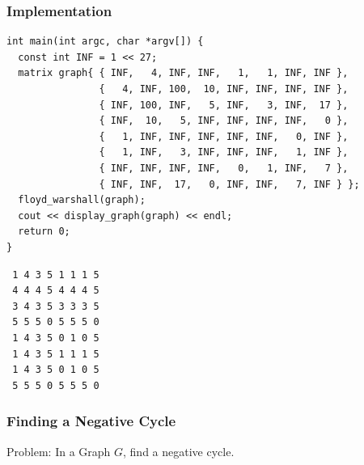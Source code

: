 \documentclass{beamer}
\begin{document}
\begin{frame}[containsverbatim]
\frametitle{Implementation}

\tiny
\begin{lstlisting}
int main(int argc, char *argv[]) {
  const int INF = 1 << 27;
  matrix graph{ { INF,   4, INF, INF,   1,   1, INF, INF },
                {   4, INF, 100,  10, INF, INF, INF, INF },
                { INF, 100, INF,   5, INF,   3, INF,  17 },
                { INF,  10,   5, INF, INF, INF, INF,   0 },
                {   1, INF, INF, INF, INF, INF,   0, INF },
                {   1, INF,   3, INF, INF, INF,   1, INF },
                { INF, INF, INF, INF,   0,   1, INF,   7 },
                { INF, INF,  17,   0, INF, INF,   7, INF } };
  floyd_warshall(graph);
  cout << display_graph(graph) << endl;
  return 0;
}
\end{lstlisting}

\scriptsize

\begin{verbatim}
 1 4 3 5 1 1 1 5
 4 4 4 5 4 4 4 5
 3 4 3 5 3 3 3 5
 5 5 5 0 5 5 5 0
 1 4 3 5 0 1 0 5
 1 4 3 5 1 1 1 5
 1 4 3 5 0 1 0 5
 5 5 5 0 5 5 5 0
\end{verbatim}

\end{frame}

\begin{frame}%
\frametitle{Finding a Negative Cycle}

\begin{mdframed}[style=exampledefault]
Problem: In a Graph $G$, find a negative cycle.
\end{mdframed}


\end{frame}

\ifanswers
\end{document}
